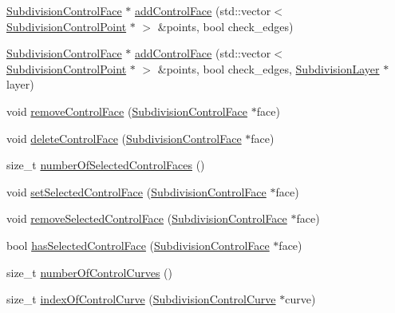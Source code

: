 \begin{DoxyCompactItemize}
\hyperlink{classShipCAD_1_1SubdivisionControlFace}{Subdivision\-Control\-Face} $\ast$ \hyperlink{classShipCAD_1_1SubdivisionSurface_a957b534788873921249cd1cc058b9d7e}{add\-Control\-Face} (std\-::vector$<$ \hyperlink{classShipCAD_1_1SubdivisionControlPoint}{Subdivision\-Control\-Point} $\ast$ $>$ \&points, bool check\-\_\-edges)
\item 
\hyperlink{classShipCAD_1_1SubdivisionControlFace}{Subdivision\-Control\-Face} $\ast$ \hyperlink{classShipCAD_1_1SubdivisionSurface_a07d8ca69ed3d45f6e54407fcca8264b2}{add\-Control\-Face} (std\-::vector$<$ \hyperlink{classShipCAD_1_1SubdivisionControlPoint}{Subdivision\-Control\-Point} $\ast$ $>$ \&points, bool check\-\_\-edges, \hyperlink{classShipCAD_1_1SubdivisionLayer}{Subdivision\-Layer} $\ast$layer)
\item 
void \hyperlink{classShipCAD_1_1SubdivisionSurface_a9cce3014753c0b74517b1747a80f6c2c}{remove\-Control\-Face} (\hyperlink{classShipCAD_1_1SubdivisionControlFace}{Subdivision\-Control\-Face} $\ast$face)
\item 
void \hyperlink{classShipCAD_1_1SubdivisionSurface_a394c490440fb20c37abfc2f38d6e50fd}{delete\-Control\-Face} (\hyperlink{classShipCAD_1_1SubdivisionControlFace}{Subdivision\-Control\-Face} $\ast$face)
\item 
size\-\_\-t \hyperlink{classShipCAD_1_1SubdivisionSurface_a084a7f6b226f8d5991f7c99607d0ddb0}{number\-Of\-Selected\-Control\-Faces} ()
\item 
void \hyperlink{classShipCAD_1_1SubdivisionSurface_ab21694a435e0c0dd6139de28ae543254}{set\-Selected\-Control\-Face} (\hyperlink{classShipCAD_1_1SubdivisionControlFace}{Subdivision\-Control\-Face} $\ast$face)
\item 
void \hyperlink{classShipCAD_1_1SubdivisionSurface_aef09d950b0970bd825a984effeee6224}{remove\-Selected\-Control\-Face} (\hyperlink{classShipCAD_1_1SubdivisionControlFace}{Subdivision\-Control\-Face} $\ast$face)
\item 
bool \hyperlink{classShipCAD_1_1SubdivisionSurface_aab0e513988645c868676831ae0093a25}{has\-Selected\-Control\-Face} (\hyperlink{classShipCAD_1_1SubdivisionControlFace}{Subdivision\-Control\-Face} $\ast$face)
\item 
size\-\_\-t \hyperlink{classShipCAD_1_1SubdivisionSurface_a076772817afcb44926a3d898754261ce}{number\-Of\-Control\-Curves} ()
\item 
size\-\_\-t \hyperlink{classShipCAD_1_1SubdivisionSurface_a83c515916e068cbed7f7afd7bf11d84a}{index\-Of\-Control\-Curve} (\hyperlink{classShipCAD_1_1SubdivisionControlCurve}{Subdivision\-Control\-Curve} $\ast$curve)

\end{DoxyCompactItemize}
